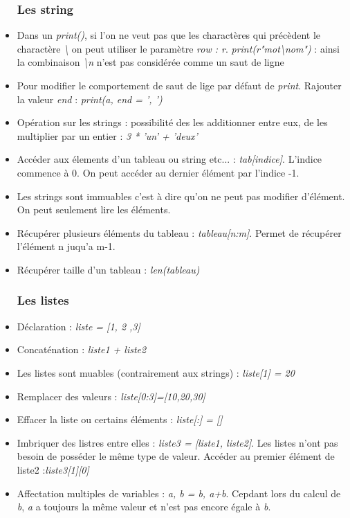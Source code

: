 \documentclass[12pt,a4paper]{article}
\begin{document}
\begin{itemize}
\subsubsection{Les string}
\item Dans un \textit{print()}, si l'on ne veut pas que les charactères qui précèdent le charactère \textit{\textbackslash} on peut utiliser le paramètre \textit{row : r}.
\newline \textit{print(r"mot\textbackslash nom")} : ainsi la combinaison \textit{\textbackslash n} n'est pas considérée comme un saut de ligne
\item Pour modifier le comportement de saut de lige par défaut de \textit{print}. Rajouter la valeur \textit{end} : \textit{print(a, end = ', ')}
\item Opération sur les strings : possibilité des les additionner entre eux, de les multiplier par un entier : \textit{3 * 'un' + 'deux'}
\item Accéder aux élements d'un tableau ou string etc... : \textit{tab[indice]}. L'indice commence à 0. On peut accéder au dernier élément par l'indice -1.
\item Les strings sont immuables c'est à dire qu'on ne peut pas modifier d'élément. On peut seulement lire les éléments.
\item Récupérer plusieurs éléments du tableau : \textit{tableau[n:m]}. Permet de récupérer l'élément n juqu'a m-1.
\item Récupérer taille d'un tableau : \textit{len(tableau)}

\subsubsection{Les listes}
\item Déclaration : \textit{liste = [1, 2 ,3]}
\item Concaténation : \textit{liste1 + liste2}
\item Les listes sont muables (contrairement aux strings) : \textit{liste[1] = 20}
\item Remplacer des valeurs : \textit{liste[0:3]=[10,20,30]}
\item Effacer la liste ou certains éléments : \textit{liste[:] = []}
\item Imbriquer des listres entre elles : \textit{liste3 = [liste1, liste2]}.  Les listes n'ont pas besoin de posséder le même type de valeur.
\newline Accéder au premier élément de liste2 :\textit{liste3[1][0]}
\item Affectation multiples de variables : \textit{a, b = b, a+b}. Cepdant lors du calcul de \textit{b}, \textit{a} a toujours la même valeur et n'est pas encore égale à \textit{b}.



\end{itemize}
\end{document}
